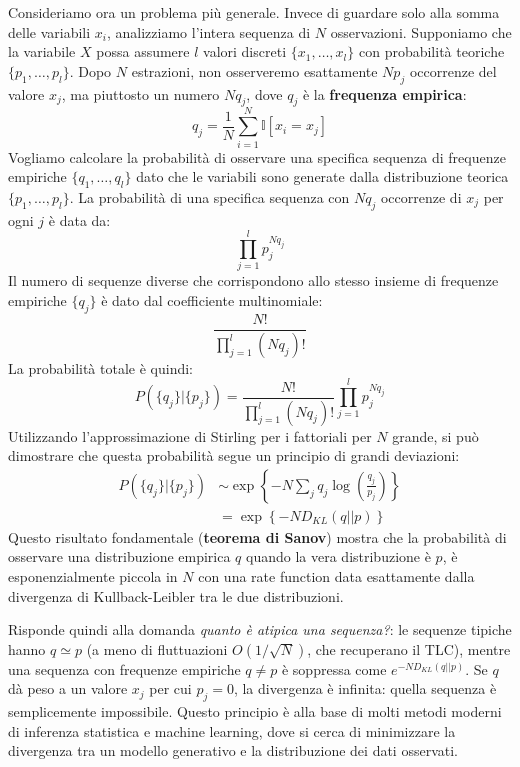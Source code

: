 Consideriamo ora un problema più generale. Invece di guardare solo alla somma delle variabili $x_i$, analizziamo l'intera sequenza di $N$ osservazioni. Supponiamo che la variabile $X$ possa assumere $l$ valori discreti $\{x_1, \dots, x_l\}$ con probabilità teoriche $\{p_1, \dots, p_l\}$.
Dopo $N$ estrazioni, non osserveremo esattamente $N p_j$ occorrenze del valore $x_j$, ma piuttosto un numero $N q_j$, dove $q_j$ è la \textbf{frequenza empirica}:
\begin{equation}
 q_j = \frac{1}{N} \sum_{i=1}^N \mathbb{I}[x_i = x_j]
\end{equation}
Vogliamo calcolare la probabilità di osservare una specifica sequenza di frequenze empiriche $\{q_1, \dots, q_l\}$ dato che le variabili sono generate dalla distribuzione teorica $\{p_1, \dots, p_l\}$.
La probabilità di una specifica sequenza con $Nq_j$ occorrenze di $x_j$ per ogni $j$ è data da:
\begin{equation*}
 \prod_{j=1}^l p_j^{Nq_j}
\end{equation*}
Il numero di sequenze diverse che corrispondono allo stesso insieme di frequenze empiriche $\{q_j\}$ è dato dal coefficiente multinomiale:
\begin{equation*}
 \frac{N!}{\prod_{j=1}^l (Nq_j)!}
\end{equation*}
La probabilità totale è quindi:
\begin{equation}
 P(\{q_j\} | \{p_j\}) = \frac{N!}{\prod_{j=1}^l (Nq_j)!} \prod_{j=1}^l p_j^{Nq_j}
\end{equation}
Utilizzando l'approssimazione di Stirling per i fattoriali per $N$ grande, si può dimostrare che questa probabilità segue un principio di grandi deviazioni:
\begin{align}
 P(\{q_j\} | \{p_j\}) &\sim \exp\left\{-N \sum_j q_j \log\left(\frac{q_j}{p_j}\right)\right\} \\
 &= \exp\left\{-N D_{KL}(q || p)\right\}
\end{align}
Questo risultato fondamentale (\textbf{teorema di Sanov}) mostra che la probabilità di osservare una distribuzione empirica $q$ quando la vera distribuzione è $p$, è esponenzialmente piccola in $N$ con una rate function data esattamente dalla divergenza di Kullback-Leibler tra le due distribuzioni.

\noindent Risponde quindi alla domanda \textit{quanto è atipica una sequenza?}: le sequenze tipiche hanno $q \simeq p$ (a meno di fluttuazioni $O(1/\sqrt{N})$, che recuperano il TLC), mentre una sequenza con frequenze empiriche $q \neq p$ è soppressa come $e^{-N D_{KL}(q||p)}$. Se $q$ dà peso a un valore $x_j$ per cui $p_j = 0$, la divergenza è infinita: quella sequenza è semplicemente impossibile. Questo principio è alla base di molti metodi moderni di inferenza statistica e machine learning, dove si cerca di minimizzare la divergenza tra un modello generativo e la distribuzione dei dati osservati.

